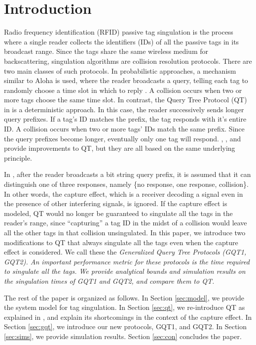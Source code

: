 \documentclass[conference]{IEEEtran}
\begin{document}
\section{Introduction}
Radio frequency identification (RFID) passive tag singulation is the process where a single reader collects the identifiers (IDs) of all the passive tags in its broadcast range.  Since the tags share the same wireless medium for backscattering, singulation algorithms are collision resolution protocols.  There are two main classes of such protocols.  In probabilistic approaches, a mechanism similar to Aloha is used, where the reader broadcasts a query, telling each tag to randomly choose a time slot in which to reply \cite{conf:Vogt01}.  A collision occurs when two or more tags choose the same time slot.  In contrast, the Query Tree Protocol (QT) in \cite{conf:Law01} is a deterministic approach.  In this case, the reader successively sends longer query prefixes.  If a tag's ID matches the prefix, the tag responds with it's entire ID.  A collision occurs when two or more tags' IDs match the same prefix.  Since the query prefixes become longer, eventually only one tag will respond.  \cite{conf:Chiang01}, \cite{conf:Bhandari01}, and \cite{journal:Myung01} provide improvements to QT, but they are all based on the same underlying principle.

In \cite{conf:Law01}, after the reader broadcasts a bit string query prefix, it is assumed that it can distinguish one of three responses, namely \{no response, one response, collision\}.  In other words, the capture effect, which is a receiver decoding a signal even in the presence of other interfering signals, is ignored.  If the capture effect is modeled, QT would no longer be guaranteed to singulate all the tags in the reader's range, since ``capturing'' a tag ID in the midst of a collision would leave all the other tags in that collision unsingulated.  In this paper, we introduce two modifications to QT that always singulate all the tags even when the capture effect is considered.  We call these the \em Generalized Query Tree Protocols \em (GQT1, GQT2).  An important performance metric for these protocols is the time required to singulate all the tags.  We provide analytical bounds and simulation results on the singulation times of GQT1 and GQT2, and compare them to QT.

The rest of the paper is organized as follows.  In Section \ref{sec:model}, we provide the system model for tag singulation.  In Section \ref{sec:qt}, we re-introduce QT as explained in \cite{conf:Law01}, and explain its shortcomings in the context of the capture effect.  In Section \ref{sec:gqt}, we introduce our new protocols, GQT1, and GQT2.  In Section \ref{sec:sims}, we provide simulation results.  Section \ref{sec:con} concludes the paper.
\end{document}
